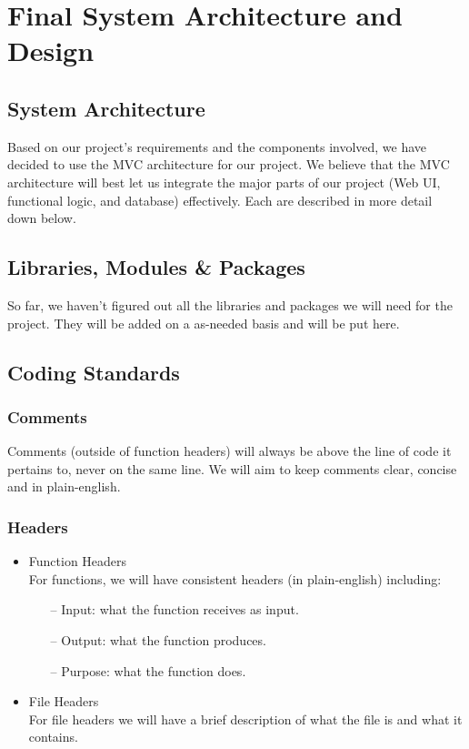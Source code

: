 \section{Final System Architecture and Design}

\subsection{System Architecture}
Based on our project's requirements and the components involved, we have decided to use the MVC architecture for our project. We believe that the MVC architecture will best let us integrate the major parts of our project (Web UI, functional logic, and database) effectively. Each are described in more detail down below. 

\subsection{Libraries, Modules \& Packages}
So far, we haven't figured out all the libraries and packages we will need for the project. They will be added on a as-needed basis and will be put here.

\subsection{Coding Standards}
\subsubsection{Comments}
Comments (outside of function headers) will always be above the line of code it pertains to, never on the same line. We will aim to keep comments clear, concise and in plain-english.

\subsubsection{Headers}

\begin{itemize}
    \item Function Headers \\
    For functions, we will have consistent headers (in plain-english) including:
    \begin{itemize}
        \item [--] Input: what the function receives as input.
        \item [--] Output: what the function produces.
        \item [--] Purpose: what the function does.
    \end{itemize}

    \item File Headers \\
    For file headers we will have a brief description of what the file is and what it contains.
\end{itemize}

